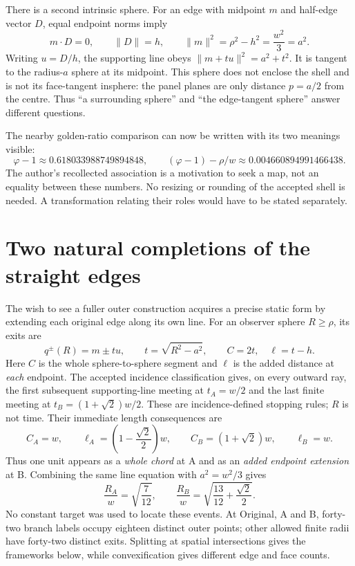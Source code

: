 \documentclass[11pt,a4paper]{article}
\newcommand{\ph}{\varphi}\newcommand{\Li}{\operatorname{Li}}\newcommand{\conv}{\operatorname{conv}}
\begin{document}
There is a second intrinsic sphere. For an edge with midpoint $m$ and half-edge vector $D$, equal endpoint norms imply
\begin{equation}\label{eq:midpoint}
m\mathbin{\cdot}D=0,\qquad \|D\|=h,\qquad
\|m\|^2=\rho^2-h^2=\frac{w^2}{3}=a^2.
\end{equation}
Writing $u=D/h$, the supporting line obeys $\|m+tu\|^2=a^2+t^2$. It is tangent to the radius-$a$ sphere at its midpoint. This sphere does not enclose the shell and is not its face-tangent insphere: the panel planes are only distance $p=a/2$ from the centre. Thus ``a surrounding sphere'' and ``the edge-tangent sphere'' answer different questions.~\cite[Sec.~3]{SP}

The nearby golden-ratio comparison can now be written with its two meanings visible:
\begin{equation}\label{eq:golden-gap}
\ph-1\approx0.618033988749894848,\qquad
(\ph-1)-\rho/w\approx0.004660894991466438 .
\end{equation}
The author's recollected association is a motivation to seek a map, not an equality between these numbers. No resizing or rounding of the accepted shell is needed. A transformation relating their roles would have to be stated separately.~\cite{Intent,TSZReview}

\section{Two natural completions of the straight edges}
The wish to see a fuller outer construction acquires a precise static form by extending each original edge along its own line. For an observer sphere $R\geq\rho$, its exits are
\begin{equation}\label{eq:line}
q^{\pm}(R)=m\pm tu,\qquad t=\sqrt{R^2-a^2},\qquad
C=2t,\quad \ell=t-h.
\end{equation}
Here $C$ is the whole sphere-to-sphere segment and $\ell$ is the added distance at \emph{each} endpoint. The accepted incidence classification gives, on every outward ray, the first subsequent supporting-line meeting at $t_A=w/2$ and the last finite meeting at $t_B=(1+\sqrt2)w/2$. These are incidence-defined stopping rules; $R$ is not time. Their immediate length consequences are
\begin{equation}\label{eq:units}
C_A=w,\qquad \ell_A=\left(1-\frac{\sqrt2}{2}\right)w,
\qquad C_B=(1+\sqrt2)w,\qquad \ell_B=w.
\end{equation}
Thus one unit appears as a \emph{whole chord} at A and as an \emph{added endpoint extension} at B. Combining the same line equation with $a^2=w^2/3$ gives
\begin{equation}\label{eq:events}
\frac{R_A}{w}=\sqrt{\frac7{12}},\qquad
\frac{R_B}{w}=\sqrt{\frac{13}{12}+\frac{\sqrt2}{2}}.
\end{equation}
No constant target was used to locate these events. At Original, A and B, forty-two branch labels occupy eighteen distinct outer points; other allowed finite radii have forty-two distinct exits. Splitting at spatial intersections gives the frameworks below, while convexification gives different edge and face counts.~\cite[Secs.~5, 8--10]{SP}
\end{document}
